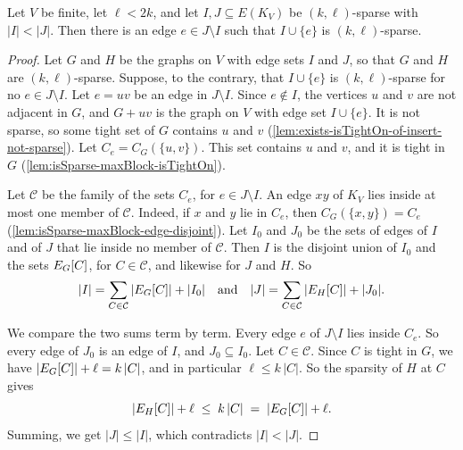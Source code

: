 \begin{lemma}[Augmentation]
  \label{lem:isSparse-aug}
  \leanok
  Let $V$ be finite, let $\ell < 2k$, and let $I, J \subseteq E(K_V)$
  be $(k, \ell)$-sparse with $|I| < |J|$. Then there is an edge
  $e \in J \setminus I$ such that $I \cup \{e\}$ is $(k, \ell)$-sparse.
\end{lemma}
\begin{proof}
  \leanok
  Let $G$ and $H$ be the graphs on $V$ with edge sets $I$ and $J$, so
  that $G$ and $H$ are $(k, \ell)$-sparse. Suppose, to the contrary,
  that $I \cup \{e\}$ is $(k, \ell)$-sparse for no
  $e \in J \setminus I$. Let $e = uv$ be an edge in $J \setminus I$.
  Since $e \notin I$, the vertices $u$ and $v$ are not adjacent in $G$,
  and $G + uv$ is the graph on $V$ with edge set $I \cup \{e\}$. It is
  not sparse, so some tight set of $G$ contains $u$ and $v$
  (\cref{lem:exists-isTightOn-of-insert-not-sparse}). Let
  $C_e = C_G(\{u, v\})$. This set contains $u$ and $v$, and it is tight
  in $G$ (\cref{lem:isSparse-maxBlock-isTightOn}).

  Let $\mathcal{C}$ be the family of the sets $C_e$, for
  $e \in J \setminus I$. An edge $xy$ of $K_V$ lies inside at most one
  member of $\mathcal{C}$. Indeed, if $x$ and $y$ lie in $C_e$, then
  $C_G(\{x, y\}) = C_e$ (\cref{lem:isSparse-maxBlock-edge-disjoint}).
  Let $I_0$ and $J_0$ be the sets of edges of $I$ and of $J$ that lie
  inside no member of $\mathcal{C}$. Then $I$ is the disjoint union of
  $I_0$ and the sets $\edgesIn{C}$, for $C \in \mathcal{C}$, and
  likewise for $J$ and $H$. So
  \[
    |I| = \sum_{C \in \mathcal{C}} |\edgesIn{C}| + |I_0|
    \quad\text{and}\quad
    |J| = \sum_{C \in \mathcal{C}} |\edgesIn[H]{C}| + |J_0|.
  \]

  We compare the two sums term by term. Every edge $e$ of
  $J \setminus I$ lies inside $C_e$. So every edge of $J_0$ is an edge
  of $I$, and $J_0 \subseteq I_0$. Let $C \in \mathcal{C}$. Since $C$ is
  tight in $G$, we have $|\edgesIn{C}| + \ell = k\,|C|$, and in
  particular $\ell \le k\,|C|$. So the sparsity of $H$ at $C$ gives
  \[
    |\edgesIn[H]{C}| + \ell \;\le\; k\,|C| \;=\; |\edgesIn{C}| + \ell.
  \]
  Summing, we get $|J| \le |I|$, which contradicts $|I| < |J|$.
\end{proof}

